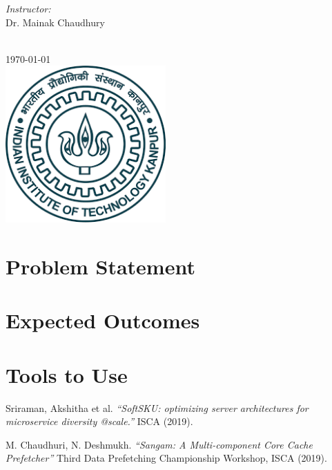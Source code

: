 \documentclass[12pt]{article}
\begin{document}
\begin{titlepage}
\begin{minipage}{0.4\textwidth}
\end{minipage}
\begin{minipage}{0.4\textwidth}
\begin{flushright} \large
\emph{Instructor:} \\
Dr. Mainak Chaudhury %
\end{flushright}
\end{minipage}\\[1cm]
{\large \today}\\[1cm] %
\includegraphics[width=\textwidth,height=6cm,keepaspectratio]{iitk.png}%
\vfill %

\end{titlepage}
\newpage

\section{Problem Statement}


\section{Expected Outcomes}


\section{Tools to Use}


\medskip
 
\begin{thebibliography}{9}
Sriraman, Akshitha et al.
\textit{“SoftSKU: optimizing server architectures for microservice diversity @scale.”}
ISCA (2019).

M. Chaudhuri, N. Deshmukh.
\textit{“Sangam: A Multi-component Core Cache Prefetcher”}
Third Data Prefetching Championship Workshop, ISCA (2019).
\end{thebibliography}
\end{document}
